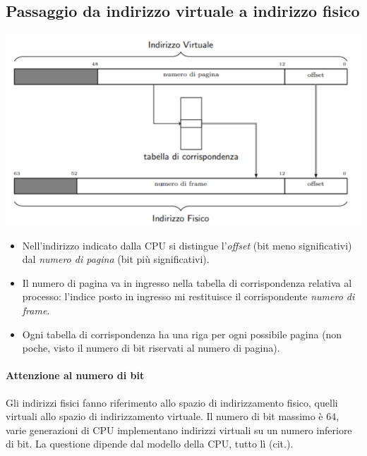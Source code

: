 \subsection{Passaggio da indirizzo virtuale a indirizzo fisico} 
\begin{center}
	\includegraphics[scale=.9]{img/214.PNG}
\end{center}
\begin{itemize}
	\item Nell'indirizzo indicato dalla CPU si distingue l'\emph{offset} (bit meno significativi) dal \emph{numero di pagina} (bit più significativi).
	\item Il numero di pagina va in ingresso nella tabella di corrispondenza relativa al processo: l'indice posto in ingresso mi restituisce il corrispondente  \emph{numero di frame}. 
	\item Ogni tabella di corrispondenza ha una riga per ogni possibile pagina (non poche, visto il numero di bit riservati al numero di pagina). 
\end{itemize}
\paragraph{Attenzione al numero di bit} Gli indirizzi fisici fanno riferimento allo spazio di indirizzamento fisico, quelli virtuali allo spazio di indirizzamento virtuale. Il numero di bit massimo è $64$, varie generazioni di CPU implementano indirizzi virtuali su un numero inferiore di bit. La questione dipende dal modello della CPU, tutto lì (cit.). 

